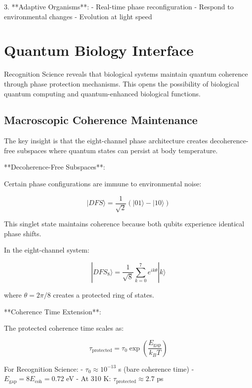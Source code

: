 \documentclass[12pt,a4paper]{report}
\begin{document}
3. **Adaptive Organisms**:
   - Real-time phase reconfiguration
   - Respond to environmental changes
   - Evolution at light speed

\section{Quantum Biology Interface}

Recognition Science reveals that biological systems maintain quantum coherence through phase protection mechanisms. This opens the possibility of biological quantum computing and quantum-enhanced biological functions.

\subsection{Macroscopic Coherence Maintenance}

The key insight is that the eight-channel phase architecture creates decoherence-free subspaces where quantum states can persist at body temperature.

**Decoherence-Free Subspaces**:

Certain phase configurations are immune to environmental noise:

\begin{equation}
|DFS\rangle = \frac{1}{\sqrt{2}}(|01\rangle - |10\rangle)
\end{equation}

This singlet state maintains coherence because both qubits experience identical phase shifts.

In the eight-channel system:

\begin{equation}
|DFS_8\rangle = \frac{1}{\sqrt{8}} \sum_{k=0}^{7} e^{ik\theta} |k\rangle
\end{equation}

where $\theta = 2\pi/8$ creates a protected ring of states.

**Coherence Time Extension**:

The protected coherence time scales as:

\begin{equation}
\tau_{\text{protected}} = \tau_0 \exp\left(\frac{E_{\text{gap}}}{k_B T}\right)
\end{equation}

For Recognition Science:
- $\tau_0 \approx 10^{-13}$ s (bare coherence time)
- $E_{\text{gap}} = 8 E_{\text{coh}} = 0.72$ eV
- At 310 K: $\tau_{\text{protected}} \approx 2.7$ ps
\end{document}
